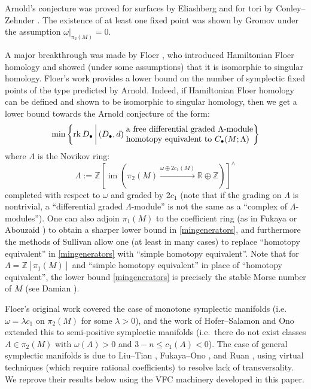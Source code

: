 \documentclass[12pt]{article}
\theoremstyle{definition}
\theoremstyle{remark}
\numberwithin{equation}{subsection}
\newcommand{\ZZ}{\mathbb Z}
\newcommand{\RR}{\mathbb R}
\newcommand{\im}{\operatorname{im}}
\newcommand{\rk}{\operatorname{rk}}
\begin{document}
Arnold's conjecture was proved for surfaces by Eliashberg \cite{eliashbergsurfaces} and for tori by Conley--Zehnder \cite{conleyzehnder}.  The existence of at least one fixed point was shown by Gromov \cite[p331, 2.3$B_4'$]{gromov} under the assumption $\omega|_{\pi_2(M)}=0$.

A major breakthrough was made by Floer \cite{floersfhs}, who introduced Hamiltonian Floer homology and showed (under some assumptions) that it is isomorphic to singular homology.  Floer's work provides a lower bound on the number of symplectic fixed points of the type predicted by Arnold.  Indeed, if Hamiltonian Floer homology can be defined and shown to be isomorphic to singular homology, then we get a lower bound towards the Arnold conjecture of the form:
\begin{equation}\label{mingenerators}
\min\left\{\rk D_\bullet\,\middle|\,(D_\bullet,d)\;\begin{matrix}\text{a free differential graded $\Lambda$-module}\hfill\cr\text{homotopy equivalent to }C_\bullet(M;\Lambda)\hfill\end{matrix}\right\}
\end{equation}
where $\Lambda$ is the Novikov ring:
\begin{equation}
\Lambda:=\ZZ[\im(\pi_2(M)\xrightarrow{\omega\oplus 2c_1(M)}\RR\oplus\ZZ)]^\wedge
\end{equation}
completed with respect to $\omega$ and graded by $2c_1$ (note that if the grading on $\Lambda$ is nontrivial, a ``differential graded $\Lambda$-module'' is not the same as a ``complex of $\Lambda$-modules'').  One can also adjoin $\pi_1(M)$ to the coefficient ring (as in Fukaya \cite{fukayagroupring} or Abouzaid \cite{abouzaidnearby}) to obtain a sharper lower bound in \eqref{mingenerators}, and furthermore the methods of Sullivan \cite{sullivangroupring} allow one (at least in many cases) to replace ``homotopy equivalent'' in \eqref{mingenerators} with ``simple homotopy equivalent''.  Note that for $\Lambda=\ZZ[\pi_1(M)]$ and ``simple homotopy equivalent'' in place of ``homotopy equivalent'', the lower bound \eqref{mingenerators} is precisely the stable Morse number of $M$ (see Damian \cite[p424, Corollary 2.6]{damian}).

Floer's original work \cite{floersfhs} covered the case of monotone symplectic manifolds (i.e.\ $\omega=\lambda c_1$ on $\pi_2(M)$ for some $\lambda>0$), and the work of Hofer--Salamon \cite{hofersalamon} and Ono \cite{ono} extended this to semi-positive symplectic manifolds (i.e.\ there do not exist classes $A\in\pi_2(M)$ with $\omega(A)>0$ and $3-n\leq c_1(A)<0$).  The case of general symplectic manifolds is due to Liu--Tian \cite{liutian}, Fukaya--Ono \cite{fukayaono}, and Ruan \cite{ruan}, using virtual techniques (which require rational coefficients) to resolve lack of transversality.  We reprove their results below using the VFC machinery developed in this paper.
\end{document}
